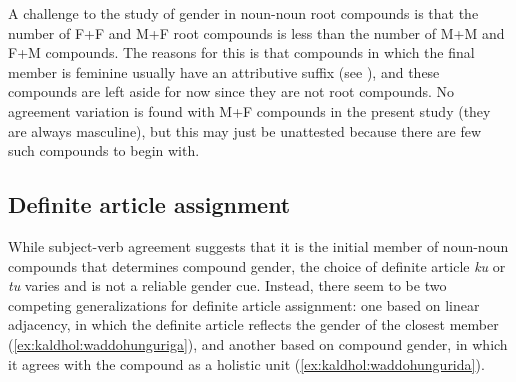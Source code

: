 \documentclass[output=paper]{langscibook}
\begin{document}
A challenge to the study of gender in noun-noun root compounds is that the number of F+F and M+F root compounds is less than the number of M+M and F+M compounds. The reasons for this is that compounds in which the final member is feminine usually have an attributive suffix (see ), and these compounds are left aside for now since they are not root compounds. No agreement variation is found with M+F compounds in the present study (they are always masculine), but this may just be unattested because there are few such compounds to begin with.

\subsection{Definite article assignment}\label{sec:kaldhol:defarticle}

While subject-verb agreement suggests that it is the initial member of noun-noun compounds that determines compound gender, the choice of definite article \textit{ku} or \textit{tu} varies and is not a reliable gender cue. Instead, there seem to be two competing generalizations for definite article assignment: one based on linear adjacency, in which the definite article reflects the gender of the closest member (\ref{ex:kaldhol:waddohunguriga}), and another based on compound gender, in which it agrees with the compound as a holistic unit (\ref{ex:kaldhol:waddohungurida}).
\end{document}
